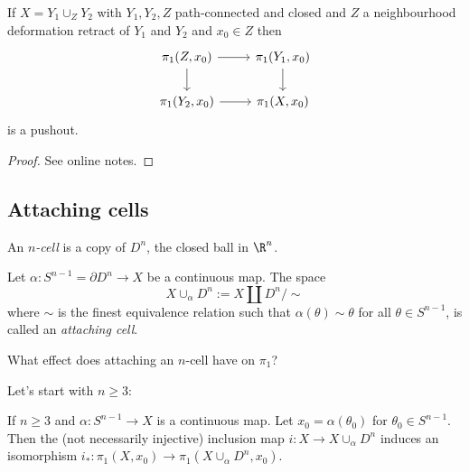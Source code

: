 \documentclass[a4paper]{article}
\begin{document}
\begin{corollary}
  If \(X = Y_1 \cup_Z Y_2\) with \(Y_1, Y_2, Z\) path-connected and closed and \(Z\) a neighbourhood deformation retract of \(Y_1\) and \(Y_2\) and \(x_0 \in Z\) then
  \[
    \begin{tikzcd}
      \pi_1(Z, x_0) \ar[r] \ar[d] & \pi_1(Y_1, x_0) \ar[d] \\
      \pi_1(Y_2, x_0) \ar[r] & \pi_1(X, x_0)
    \end{tikzcd}
  \]
  is a pushout.
\end{corollary}

\begin{proof}
  See online notes.
\end{proof}

\subsection{Attaching cells}

\begin{definition}[cell]
  An \emph{\(n\)-cell} is a copy of \(D^n\), the closed ball in \(\R^n\).
\end{definition}

\begin{definition}
  Let \(\alpha: S^{n - 1} = \partial D^n \to X\) be a continuous map. The space
  \[
    X \cup_\alpha D^n := X \amalg D^n / \sim
  \]
  where \(\sim\) is the finest equivalence relation such that \(\alpha(\theta) \sim \theta\) for all \(\theta \in S^{n - 1}\), is called an \emph{attaching cell}.
\end{definition}

What effect does attaching an \(n\)-cell have on \(\pi_1\)?

Let's start with \(n \geq 3\):

\begin{lemma}
  If \(n \geq 3\) and \(\alpha: S^{n - 1} \to X\) is a continuous map. Let \(x_0 = \alpha(\theta_0)\) for \(\theta_0 \in S^{n - 1}\). Then the (not necessarily injective) inclusion map \(i: X \to X \cup_\alpha D^n\) induces an isomorphism \(i_*: \pi_1(X, x_0) \to \pi_1(X \cup_\alpha D^n, x_0)\).
\end{lemma}
\end{document}
